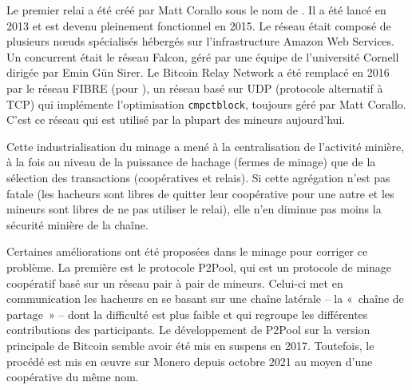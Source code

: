 Le premier relai a été créé par Matt Corallo sous le nom de . Il a été lancé en 2013 et est devenu pleinement fonctionnel en 2015. Le réseau était composé de plusieurs nœuds spécialisés hébergés sur l'infrastructure Amazon Web Services. Un concurrent était le réseau Falcon, géré par une équipe de l'université Cornell dirigée par Emin Gün Sirer. Le Bitcoin Relay Network a été remplacé en 2016 par le réseau FIBRE (pour ), un réseau basé sur UDP (protocole alternatif à TCP) qui implémente l'optimisation \texttt{cmpctblock}, toujours géré par Matt Corallo. C'est ce réseau qui est utilisé par la plupart des mineurs aujourd'hui.


Cette industrialisation du minage a mené à la centralisation de l'activité minière, à la fois au niveau de la puissance de hachage (fermes de minage) que de la sélection des transactions (coopératives et relais). Si cette agrégation n'est pas fatale (les hacheurs sont libres de quitter leur coopérative pour une autre et les mineurs sont libres de ne pas utiliser le relai), elle n'en diminue pas moins la sécurité minière de la chaîne.

Certaines améliorations ont été proposées dans le minage pour corriger ce problème. La première est le protocole P2Pool, qui est un protocole de minage coopératif basé sur un réseau pair à pair de mineurs. Celui-ci met en communication les hacheurs en se basant sur une chaîne latérale -- la «~chaîne de partage~» -- dont la difficulté est plus faible et qui regroupe les différentes contributions des participants. Le développement de P2Pool sur la version principale de Bitcoin semble avoir été mis en suspens en 2017. Toutefois, le procédé est mis en œuvre sur Monero depuis octobre 2021 au moyen d'une coopérative du même nom.

